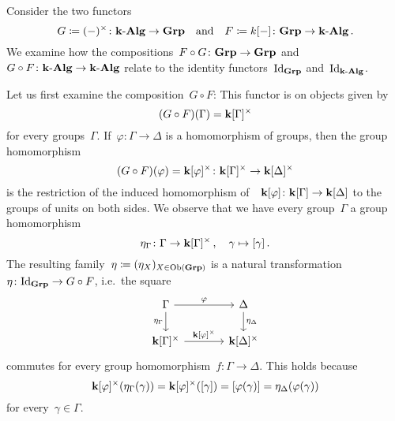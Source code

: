 \begin{example}
  Consider the two functors
  \[
              G
    \coloneqq  (-)^\times
    \colon    \text{$\mathbf{k}$-$\mathbf{Alg}$}
    \to       \mathbf{Grp}
    \quad\text{and}\quad
              F
    \coloneqq  k[-]
    \colon    \mathbf{Grp}
    \to       \text{$\mathbf{k}$-$\mathbf{Alg}$} \,.
  \]
  We examine how the compositions~$F \circ G \colon \mathbf{Grp} \to \mathbf{Grp}$ and~$G \circ F \colon \text{$\mathbf{k}$-$\mathbf{Alg}$} \to \text{$\mathbf{k}$-$\mathbf{Alg}$}$ relate to the identity functors~$\mathrm{Id}_{\mathbf{Grp}}$ and~$\mathrm{Id}_{\text{$\mathbf{k}$-$\mathbf{Alg}$}}$.
  
  Let us first examine the composition~$G \circ F$:
  This functor is on objects given by
  \[
      (G \circ F)(\Gamma)
    = \mathbf{k}[\Gamma]^\times
  \]
  for every groups~$\Gamma$.
  If~$\varphi \colon \Gamma \to \Delta$ is a homomorphism of groups, then the group homomorphism
  \[
            (G \circ F)(\varphi)
    =       \mathbf{k}[\varphi]^\times
    \colon  \mathbf{k}[\Gamma]^\times
    \to     \mathbf{k}[\Delta]^\times
  \]
  is the restriction of the induced homomorphism of~{\kalgs}~$\mathbf{k}[\varphi] \colon \mathbf{k}[\Gamma] \to \mathbf{k}[\Delta]$ to the groups of units on both sides.
  We observe that we have every group~$\Gamma$ a group homomorphism
  \[
            \eta_\Gamma
    \colon  \Gamma
    \to     \mathbf{k}[\Gamma]^\times \,,
    \quad   \gamma
    \mapsto [\gamma] \,.
  \]
  The resulting family~$\eta \coloneqq (\eta_X)_{X \in \operatorname{Ob}(\mathbf{Grp})}$ is a natural transformation~$\eta \colon \mathrm{Id}_{\mathbf{Grp}} \to G \circ F$, i.e.\ the square
  \[
    \begin{tikzcd}[column sep = large]
        \Gamma
        \arrow{r}[above]{\varphi}
        \arrow{d}[left]{\eta_\Gamma}
      & \Delta
        \arrow{d}[right]{\eta_\Delta}
      \\
        \kf[\Gamma]^\times
        \arrow{r}[above]{\kf[\varphi]^\times}
      & \kf[\Delta]^\times
    \end{tikzcd}
  \]
  commutes for every group homomorphism~$f \colon \Gamma \to \Delta$.
  This holds because
  \[
      \mathbf{k}[\varphi]^\times( \eta_\Gamma( \gamma ) )
    = \mathbf{k}[\varphi]^\times( [\gamma] )
    = [\varphi(\gamma)]
    = \eta_\Delta( \varphi( \gamma ) )
  \]
  for every~$\gamma \in \Gamma$.
  

\end{example}
